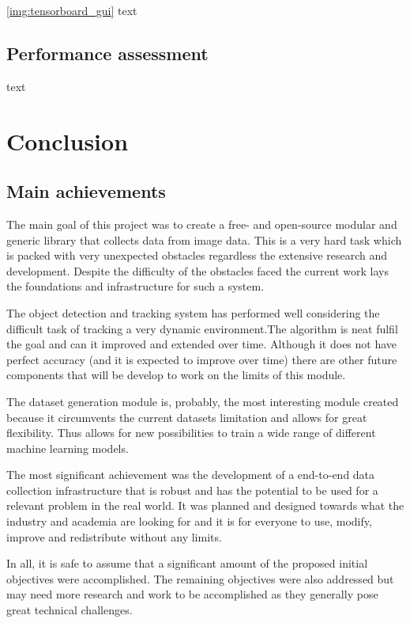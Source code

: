 \documentclass[
    11pt,
    twoside
]{report}
\begin{document}
\ref{img:tensorboard_gui} text


\section{Performance assessment}


text



\chapter{Conclusion}



\section{Main achievements}

The main goal of this project was to create a free- and open-source modular and generic library that collects data from image data. This is a very hard task which is packed with very unexpected obstacles regardless the extensive research and development. Despite the difficulty of the obstacles faced the current work lays the foundations and infrastructure for such a system.


The object detection and tracking system has performed well considering the difficult task of tracking a very dynamic environment.The algorithm is neat fulfil the goal and can it improved and extended over time. Although it does not have perfect accuracy (and it is expected to improve over time) there are other future components that will be develop to work on the limits of this module.


The dataset generation module is, probably, the most interesting module created because it circumvents the current datasets limitation and allows for great flexibility. Thus allows for new possibilities to train a wide range of different machine learning models.


The most significant achievement was the development of a end-to-end data collection infrastructure that is robust and has the potential to be used for a relevant problem in the real world. It was planned and designed towards what the industry and academia are looking for and it is for everyone to use, modify, improve and redistribute without any limits.


In all, it is safe to assume that a significant amount of the proposed initial objectives were accomplished. The remaining objectives were also addressed but may need more research and work to be accomplished as they generally pose great technical challenges.
\end{document}
